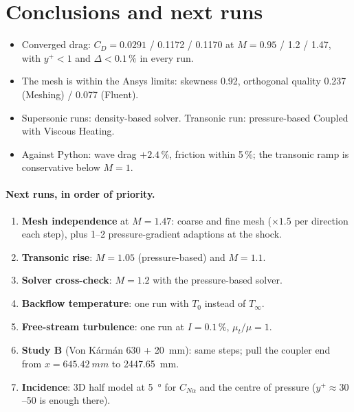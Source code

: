 \section{Conclusions and next runs}
\label{sec:conclusions}

\begin{itemize}
\item Converged drag: $C_D = 0.0291$ / 0.1172 / 0.1170 at $M = 0.95$ / 1.2 / 1.47, with $y^+ < 1$ and
$\Delta < 0.1\,\%$ in every run.
\item The mesh is within the Ansys limits: skewness 0.92, orthogonal quality 0.237 (Meshing) / 0.077
(Fluent).
\item Supersonic runs: density-based solver. Transonic run: pressure-based Coupled with Viscous Heating.
\item Against Python: wave drag $+2.4\,\%$, friction within 5\,\%; the transonic ramp is conservative below
$M = 1$.
\end{itemize}

\paragraph{Next runs, in order of priority.}
\begin{enumerate}
\item \textbf{Mesh independence} at $M = 1.47$: coarse and fine mesh ($\times1.5$ per direction each step),
plus 1--2 pressure-gradient adaptions at the shock.
\item \textbf{Transonic rise}: $M = 1.05$ (pressure-based) and $M = 1.1$.
\item \textbf{Solver cross-check}: $M = 1.2$ with the pressure-based solver.
\item \textbf{Backflow temperature}: one run with $T_0$ instead of $T_\infty$.
\item \textbf{Free-stream turbulence}: one run at $I = 0.1\,\%$, $\mu_t/\mu = 1$.
\item \textbf{Study B} (Von K\'arm\'an 630 + \SI{20}{mm}): same steps; pull the coupler end from
$x = \SI{645.42}{mm}$ to \SI{2447.65}{mm}.
\item \textbf{Incidence}: 3D half model at \SI{5}{\degree} for $C_{N\alpha}$ and the centre of pressure
($y^+ \approx 30$--50 is enough there).
\end{enumerate}
